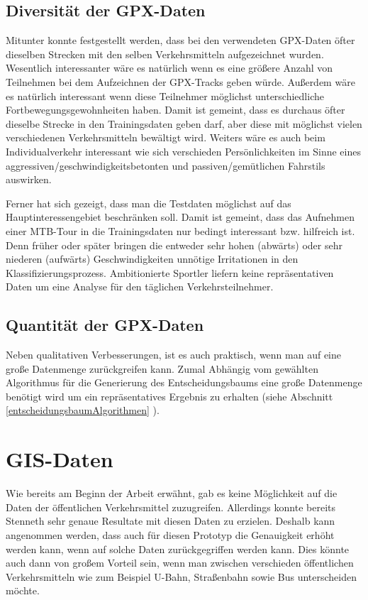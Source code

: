 \subsection{Diversität der GPX-Daten}
Mitunter konnte festgestellt werden, dass bei den verwendeten GPX-Daten öfter dieselben Strecken mit den selben Verkehrsmitteln aufgezeichnet wurden. Wesentlich interessanter wäre es natürlich wenn es eine größere Anzahl von Teilnehmen bei dem Aufzeichnen der GPX-Tracks geben würde. Außerdem wäre es natürlich interessant wenn diese Teilnehmer möglichst unterschiedliche Fortbewegungsgewohnheiten haben. Damit ist gemeint, dass es durchaus öfter dieselbe Strecke in den Trainingsdaten geben darf, aber diese mit möglichst vielen verschiedenen Verkehrsmitteln bewältigt wird. Weiters wäre es auch beim Individualverkehr interessant wie sich verschieden Persönlichkeiten im Sinne eines aggressiven/geschwindigkeitsbetonten und passiven/gemütlichen Fahrstils auswirken. 

Ferner hat sich gezeigt, dass man die Testdaten möglichst auf das Hauptinteressengebiet beschränken soll. Damit ist gemeint, dass das Aufnehmen einer MTB-Tour in die Trainingsdaten nur bedingt interessant bzw. hilfreich ist. Denn früher oder später bringen die entweder sehr hohen (abwärts) oder sehr niederen (aufwärts) Geschwindigkeiten unnötige Irritationen in den Klassifizierungsprozess. Ambitionierte Sportler liefern keine repräsentativen Daten um eine Analyse für den täglichen Verkehrsteilnehmer. 

\subsection{Quantität der GPX-Daten}
Neben qualitativen Verbesserungen, ist es auch praktisch, wenn man auf eine große Datenmenge zurückgreifen kann. Zumal Abhängig vom gewählten Algorithmus für die Generierung des Entscheidungsbaums eine große Datenmenge benötigt wird um ein repräsentatives Ergebnis zu erhalten (siehe Abschnitt \ref{entscheidungsbaumAlgorithmen} ).

\section{GIS-Daten}
Wie bereits am Beginn der Arbeit erwähnt, gab es keine Möglichkeit auf die Daten der öffentlichen Verkehrsmittel zuzugreifen. Allerdings konnte bereits Stenneth \cite{stenneth_transportation_2011} sehr genaue Resultate mit diesen Daten zu erzielen. Deshalb kann angenommen werden, dass auch für diesen Prototyp die Genauigkeit erhöht werden kann, wenn auf solche Daten zurückgegriffen werden kann. Dies könnte auch dann von großem Vorteil sein, wenn man zwischen verschieden öffentlichen Verkehrsmitteln wie zum Beispiel U-Bahn, Straßenbahn sowie Bus unterscheiden möchte. 

